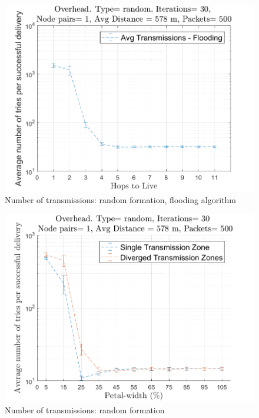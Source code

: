 \begin{figure}[hbtp]
\centering
\includegraphics[width=\simResultFigSize\textwidth,height=\textheight,keepaspectratio]{ncsuthesis-0.6/Chapter-5/figs/fl_trans_random.png}
\caption{Number of transmissions: random formation, flooding algorithm}
\label{fig:fl_trans_random}
\end{figure}

\begin{figure}[hbtp]
\centering
\includegraphics[width=\simResultFigSize\textwidth,height=\textheight,keepaspectratio]{ncsuthesis-0.6/Chapter-5/figs/pe_trans_random.png}
\caption{Number of transmissions: random formation}
\label{fig:pe_trans_random}
\end{figure}

